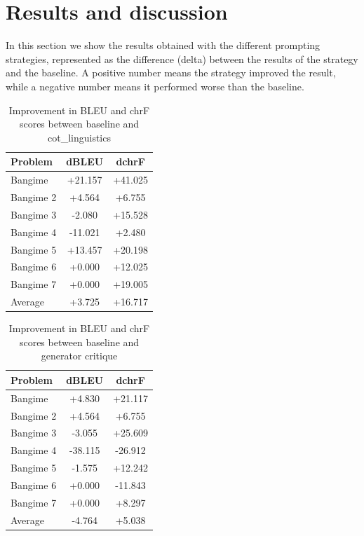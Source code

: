 \documentclass[
	a4paper, %
	10pt, %
	unnumberedsections, %
	twoside, %
]{LTJournalArticle}
\begin{document}
\section{Results and discussion}
In this section we show the results obtained with the different prompting strategies, represented as the difference (delta) between the results of the strategy and the baseline. A positive number means the strategy improved the result, while a negative number means it performed worse than the baseline.
\begin{table}[h]
\centering
\caption{Improvement in BLEU and chrF scores between baseline and cot\_linguistics}
\label{tab:improvement_baseline_cotl}
\begin{tabular}{l c c}
\hline
\textbf{Problem} & \textbf{dBLEU} & \textbf{dchrF} \\
\hline
Bangime    & +21.157 & +41.025 \\
Bangime 2    & +4.564 & +6.755 \\
Bangime 3    & -2.080 & +15.528 \\
Bangime 4    & -11.021 & +2.480 \\
Bangime 5    & +13.457 & +20.198 \\
Bangime 6    & +0.000 &  +12.025 \\
Bangime 7    & +0.000 & +19.005 \\
\hline
Average		& +3.725 & +16.717 \\
\hline
\end{tabular}
\end{table}

\begin{table}[h]
\centering
\caption{Improvement in BLEU and chrF scores between baseline and generator critique}
\label{tab:improvement_baseline_gencr}
\begin{tabular}{l c c}
\hline
\textbf{Problem} & \textbf{dBLEU} & \textbf{dchrF} \\
\hline
Bangime    & +4.830 & +21.117 \\
Bangime 2    & +4.564 & +6.755 \\
Bangime 3    & -3.055 & +25.609 \\
Bangime 4    & -38.115 & -26.912 \\
Bangime 5    & -1.575 & +12.242 \\
Bangime 6    & +0.000 &  -11.843 \\
Bangime 7    & +0.000 & +8.297 \\
\hline
Average		& -4.764 & +5.038 \\
\hline
\end{tabular}
\end{table}
\end{document}
